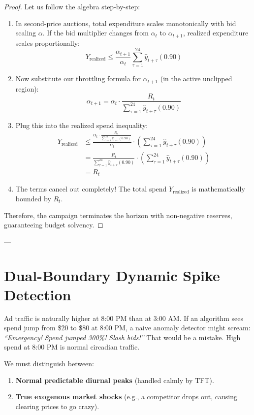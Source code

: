 \documentclass[11pt,a4paper]{article}
\begin{document}
\begin{proof}
Let us follow the algebra step-by-step:
\begin{enumerate}
    \item In second-price auctions, total expenditure scales monotonically with bid scaling $\alpha$. If the bid multiplier changes from $\alpha_t$ to $\alpha_{t+1}$, realized expenditure scales proportionally:
    \begin{equation}
        Y_{\text{realized}} \le \frac{\alpha_{t+1}}{\alpha_t} \sum_{\tau=1}^{24} \hat{y}_{t+\tau}(0.90)
    \end{equation}
    \item Now substitute our throttling formula for $\alpha_{t+1}$ (in the active unclipped region):
    \begin{equation}
        \alpha_{t+1} = \alpha_t \cdot \frac{R_t}{\sum_{\tau=1}^{24} \hat{y}_{t+\tau}(0.90)}
    \end{equation}
    \item Plug this into the realized spend inequality:
    \begin{align}
        Y_{\text{realized}} &\le \frac{\alpha_t \cdot \frac{R_t}{\sum_{\tau=1}^{24} \hat{y}_{t+\tau}(0.90)}}{\alpha_t} \cdot \left(\sum_{\tau=1}^{24} \hat{y}_{t+\tau}(0.90)\right) \\
        &= \frac{R_t}{\sum_{\tau=1}^{24} \hat{y}_{t+\tau}(0.90)} \cdot \left(\sum_{\tau=1}^{24} \hat{y}_{t+\tau}(0.90)\right) \\
        &= R_t
    \end{align}
    \item The terms cancel out completely! The total spend $Y_{\text{realized}}$ is mathematically bounded by $R_t$.
\end{enumerate}
Therefore, the campaign terminates the horizon with non-negative reserves, guaranteeing budget solvency.
\end{proof}

---

\section{Dual-Boundary Dynamic Spike Detection}

\begin{intuitionbox}
Ad traffic is naturally higher at 8:00 PM than at 3:00 AM. If an algorithm sees spend jump from \$20 to \$80 at 8:00 PM, a naive anomaly detector might scream: \textit{``Emergency! Spend jumped 300\%! Slash bids!''}
That would be a mistake. High spend at 8:00 PM is normal circadian traffic. 

We must distinguish between:
\begin{enumerate}
    \item \textbf{Normal predictable diurnal peaks} (handled calmly by TFT).
    \item \textbf{True exogenous market shocks} (e.g., a competitor drops out, causing clearing prices to go crazy).
\end{enumerate}
\end{intuitionbox}
\end{document}
